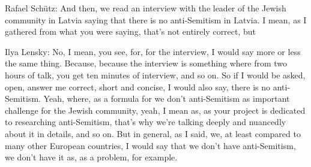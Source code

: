 Rafael Schütz: And then, we read an interview with the leader of the Jewish community in Latvia saying that there is no anti-Semitism in Latvia. I mean, as I gathered from what you were saying, that’s not entirely correct, but 

Ilya Lensky: No, I mean, you see, for, for the interview, I would say more or less the same thing. Because, because the interview is something where from two hours of talk, you get ten minutes of interview, and so on. So if I would be asked, open, answer me correct, short and concise, I would also say, there is no anti-Semitism. Yeah, where, as a formula for we don’t anti-Semitism as important challenge for the Jewish community, yeah, I mean as, as your project is dedicated to researching anti-Semitism, that’s why we’re talking deeply and nuancedly about it in details, and so on. But in general, as I said, we, at least compared to many other European countries, I would say that we don’t have anti-Semitism, we don’t have it as, as a problem, for example.